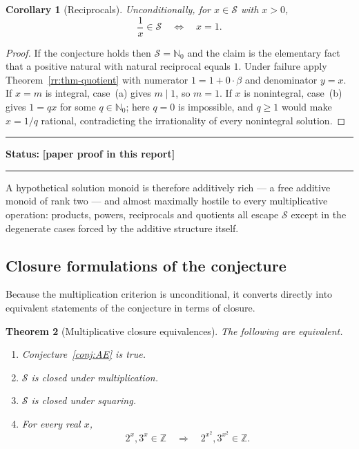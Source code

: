 \documentclass[11pt,oneside]{article}
\newtheorem{theorem}{Theorem}[section]
\newtheorem{corollary}[theorem]{Corollary}
\theoremstyle{definition}
\theoremstyle{remark}
\newcommand{\Nzero}{\mathbb N_0}
\newcommand{\Z}{\mathbb Z}
\newcommand{\Sol}{\mathcal S}
\newcommand{\statusnew}{\textcolor{newgreen}{\textbf{[paper proof in this report]}}}
\newenvironment{statusbox}[1]
{\begin{center}\begin{minipage}{0.94\textwidth}\raggedright\hbadness=10000\hrule
\vspace{0.45em}\textbf{Status:} #1\par\vspace{0.35em}}
{\vspace{0.35em}\hrule\end{minipage}\end{center}}
\begin{document}
\begin{corollary}[Reciprocals]
\label{rr:cor-reciprocal}
Unconditionally, for $x\in\Sol$ with $x>0$,
\[
 \frac1x\in\Sol
 \quad\Longleftrightarrow\quad
 x=1 .
\]
\end{corollary}

\begin{proof}
If the conjecture holds then $\Sol=\Nzero$ and the claim is the elementary fact that a
positive natural with natural reciprocal equals $1$.  Under failure apply
Theorem~\ref{rr:thm-quotient} with numerator $1=1+0\cdot\beta$ and denominator $y=x$.  If
$x=m$ is integral, case~(a) gives $m\mid1$, so $m=1$.  If $x$ is nonintegral, case~(b) gives
$1=qx$ for some $q\in\Nzero$; here $q=0$ is impossible, and $q\ge1$ would make $x=1/q$
rational, contradicting the irrationality of every nonintegral solution.
\end{proof}

\begin{statusbox}{\statusnew}
\end{statusbox}

A hypothetical solution monoid is therefore additively rich --- a free additive monoid of
rank two --- and almost maximally hostile to every multiplicative operation: products,
powers, reciprocals and quotients all escape $\Sol$ except in the degenerate cases forced by
the additive structure itself.

\subsection{Closure formulations of the conjecture}

Because the multiplication criterion is unconditional, it converts directly into equivalent
statements of the conjecture in terms of closure.

\begin{theorem}[Multiplicative closure equivalences]
\label{rr:thm-closure-equiv}
The following are equivalent.
\begin{enumerate}[label=\textup{(\roman*)}]
\item Conjecture~\ref{conj:AE} is true.
\item $\Sol$ is closed under multiplication.
\item $\Sol$ is closed under squaring.
\item For every real $x$,
\[
 2^x,3^x\in\Z
 \quad\Longrightarrow\quad
 2^{x^2},3^{x^2}\in\Z .
\]
\end{enumerate}
\end{theorem}
\end{document}
